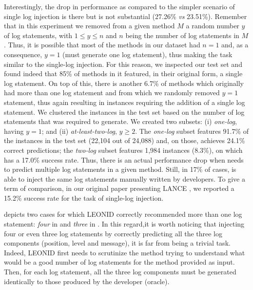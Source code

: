 Interestingly, the drop in performance as compared to the simpler scenario of single log injection is there but is not substantial (27.26\% \emph{vs} 23.51\%). Remember that in this experiment we removed from a given \java method $M$ a random number $y$ of log statements, with $1 \leq y \leq n$ and $n$ being the number of log statements in $M$. Thus, it is possible that most of the methods in our dataset had $n=1$ and, as a consequence, $y=1$ (\ie \approach must generate one log statement), thus making the task similar to the single-log injection. For this reason, we inspected our test set and found indeed that 85\% of methods in it featured, in their original form, a single log statement. On top of this, there is another 6.7\% of methods which originally had more than one log statement and from which we randomly removed $y=1$ statement, thus again resulting in instances requiring the addition of a single log statement. We clustered the instances in the test set based on the number of log statements that \approach was required to generate. We created two subsets: (i) \emph{one-log}, having $y=1$; and (ii) \emph{at-least-two-log}, $y\geq2$. The \emph{one-log} subset features 91.7\% of the instances in the test set (22,104 out of 24,088) and, on those, \approach achieves 24.1\% correct predictions; the \emph{two-log} subset features 1,984 instances (8.3\%), on which \approach has a 17.0\% success rate. Thus, there is an actual performance drop when \approach needs to predict multiple log statements in a given method. Still, in 17\% of cases, \approach is able to inject the same log statements manually written by developers. To give a term of comparison, in our original paper presenting LANCE \cite{mastropaolo2022using}, we reported a 15.2\% success rate for the task of single-log injection.

 depicts two cases for which LEONID correctly recommended more than one log statement: \textit{four} in  and \textit{three} in .
In this regard,it is worth noticing that injecting four or even three log statements by correctly predicting all the three log components (\ie position, level and message), it is far from being a trivial task. Indeed, LEONID first needs to scrutinize the method trying to understand what would be a good number of log statements for the method provided as input. Then, for each log statement, all the three log components must be generated identically to those produced by the developer (\ie oracle).



